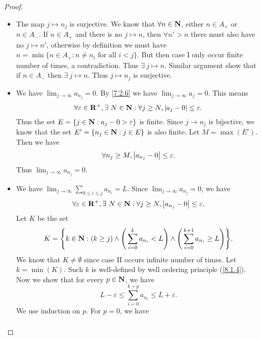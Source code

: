 \begin{proof}
\begin{itemize}
          But this means \(\sum_{n \in A_-} a_n\) is absolutely convergent, a contradiction.
          Thus case I occurs infinite number of times.
          Similar proof show that case II also occurs infinite number of times.
    \item The map \(j \mapsto n_j\) is surjective.
          We know that \(\forall n \in \mathbf{N}\), either \(n \in A_+\) or \(n \in A_-\).
          If \(n \in A_+\) and there is no \(j \mapsto n\), then \(\forall n' > n\) there must also have no \(j \mapsto n'\), otherwise by definition we must have \(n = \min\{n \in A_+ : n \neq n_i \text{ for all } i < j\}\).
          But then case I only occur finite number of times, a contradiction.
          Thus \(\exists\ j \mapsto n\).
          Similar argument show that if \(n \in A_-\) then \(\exists\ j \mapsto n\).
          Thus \(j \mapsto n_j\) is surjective.
    \item We have \(\lim_{j \to \infty} a_{n_j} = 0\).
          By \cref{7.2.6} we have \(\lim_{j \to \infty} a_j = 0\).
          This means
          \[
            \forall \varepsilon \in \mathbf{R}^+, \exists\ N \in \mathbf{N} : \forall j \geq N, \left\lvert a_j - 0\right\rvert \leq \varepsilon.
          \]
          Thus the set \(E = \{j \in \mathbf{N} : a_j - 0 > \varepsilon\}\) is finite.
          Since \(j \to n_j\) is bijective, we know that the set \(E' = \{n_j \in \mathbf{N} : j \in E\}\) is also finite.
          Let \(M = \max(E')\).
          Then we have
          \[
            \forall n_j \geq M, \left\lvert a_{n_j} - 0\right\rvert \leq \varepsilon.
          \]
          Thus \(\lim_{j \to \infty} a_{n_j} = 0\).
    \item We have \(\lim_{j \to \infty} \sum_{0 \leq i \leq j} a_{n_i} = L\).
          Since \(\lim_{j \to \infty} a_{n_j} = 0\), we have
          \[
            \forall \varepsilon \in \mathbf{R}^+, \exists\ N \in \mathbf{N} : \forall j \geq N, \left\lvert a_{n_j} - 0\right\rvert \leq \varepsilon.
          \]
          Let \(K\) be the set
          \[
            K = \Bigg\{k \in \mathbf{N} : (k \geq j) \land \Bigg(\sum_{i = 0}^k a_{n_i} < L\Bigg) \land \Bigg(\sum_{i = 0}^{k + 1} a_{n_i} \geq L\Bigg)\Bigg\}.
          \]
          We know that \(K \neq \emptyset\) since case II occurs infinite number of times.
          Let \(k = \min(K)\).
          Such \(k\) is well-defined by well ordering principle (\cref{8.1.4}).
          Now we show that for every \(p \in \mathbf{N}\), we have
          \[
            L - \varepsilon \leq \sum_{i = 0}^{k + p} a_{n_i} \leq L + \varepsilon.
          \]
          We use induction on \(p\).
          For \(p = 0\), we have
          \begin{align*}

\end{align*}
\end{itemize}
\end{proof}
